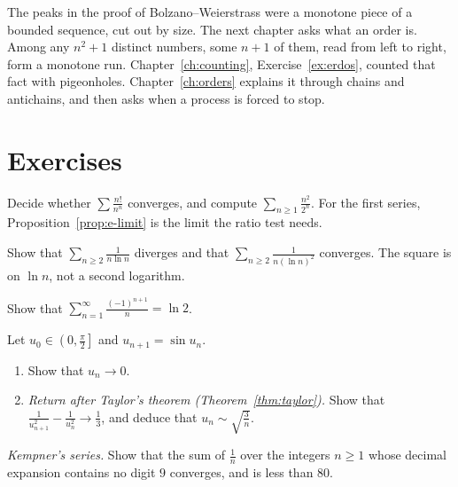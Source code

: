 The peaks in the proof of Bolzano--Weierstrass were a monotone piece of a bounded sequence, cut out by size. The next chapter asks what an order is. Among any $n^2+1$ distinct numbers, some $n+1$ of them, read from left to right, form a monotone run. Chapter~\ref{ch:counting}, Exercise~\ref{ex:erdos}, counted that fact with pigeonholes. Chapter~\ref{ch:orders} explains it through chains and antichains, and then asks when a process is forced to stop.

\section{Exercises}

\begin{exercise}[$\star$]\label{ex:nature}
Decide whether $\sum\frac{n!}{n^n}$ converges, and compute $\sum_{n\ge1}\frac{n^2}{2^n}$. For the first series, Proposition~\ref{prop:e-limit} is the limit the ratio test needs.
\end{exercise}

\begin{exercise}[$\star$]\label{ex:bertrand}
Show that $\sum_{n\ge2}\frac1{n\ln n}$ diverges and that $\sum_{n\ge2}\frac1{n(\ln n)^2}$ converges. The square is on $\ln n$, not a second logarithm.
\end{exercise}

\begin{exercise}[$\star\star$]\label{ex:ln2}
Show that $\displaystyle\sum_{n=1}^\infty\frac{(-1)^{n+1}}n=\ln2$.
\end{exercise}

\begin{exercise}[$\star\star$]\label{ex:sin}
Let $u_0\in\left(0,\frac\pi2\right]$ and $u_{n+1}=\sin u_n$.
\begin{enumerate}[label=(\alph*)]
\item Show that $u_n\to0$.
\item \emph{Return after Taylor's theorem (Theorem~\ref{thm:taylor}).}
Show that $\frac1{u_{n+1}^2}-\frac1{u_n^2}\to\frac13$, and deduce that $u_n\sim\sqrt{\frac3n}$.
\end{enumerate}
\end{exercise}

\begin{exercise}[$\star\star$]\label{ex:kempner}
\emph{Kempner's series.} Show that the sum of $\frac1n$ over the integers $n\ge1$ whose decimal expansion contains no digit $9$ converges, and is less than $80$.
\end{exercise}

